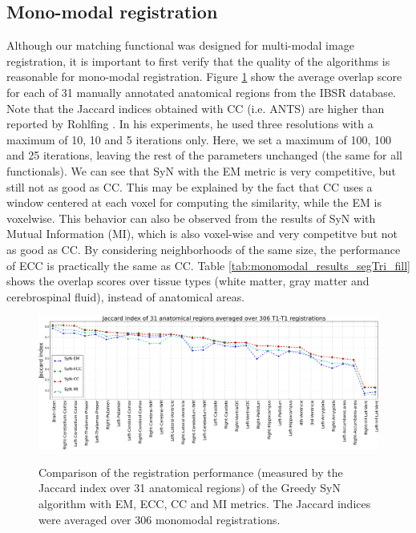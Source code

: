 \subsection{Mono-modal registration}
Although our matching functional was designed for multi-modal image registration, it is important to first verify that the quality of the algorithms is reasonable for mono-modal registration. Figure \ref{fig:mono_graph_seg} show the average overlap score for each of 31 manually annotated anatomical regions from the IBSR database. Note that the Jaccard indices obtained with CC (i.e. ANTS) are higher than reported by Rohlfing \cite{Rohlfing2012}. In his experiments, he used three resolutions with a maximum of 10, 10 and 5 iterations only. Here, we set a maximum of 100, 100 and 25 iterations, leaving the rest of the parameters unchanged (the same for all functionals). We can see that SyN with the EM metric is very competitive, but still not as good as CC. This may be explained by the fact that CC uses a window centered at each voxel for computing the similarity, while the EM is voxelwise. This behavior can also be observed from the results of SyN with Mutual Information (MI), which is also voxel-wise and very competitve but not as good as CC. By considering neighborhoods of the same size, the performance of ECC is practically the same as CC. Table \ref{tab:monomodal_results_segTri_fill} shows the overlap scores over tissue types (white matter, gray matter and cerebrospinal fluid), instead of anatomical areas.
%


\begin{figure}[t!]
\centering
\includegraphics[width=1.0\linewidth]{./images/mono_lines_seg.png}\\
\caption{{\small Comparison of the registration performance (measured by the Jaccard index over 31 anatomical regions) of the Greedy SyN algorithm with EM, ECC, CC and MI metrics. The Jaccard indices were averaged over 306 monomodal registrations.}}
\label{fig:mono_graph_seg}
\end{figure}

